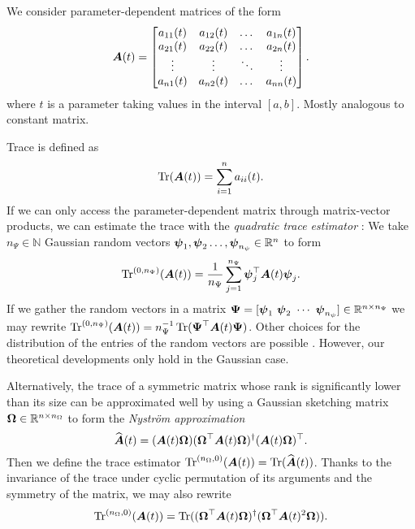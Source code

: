 \documentclass[12pt]{article}
\begin{document}
We consider parameter-dependent matrices of the form
\begin{equation}
    \boldsymbol{A}(t) = \begin{bmatrix}
        a_{11}(t) & a_{12}(t) & \dots & a_{1n}(t) \\
        a_{21}(t) & a_{22}(t) & \dots & a_{2n}(t) \\
        \vdots & \vdots & \ddots & \vdots \\
        a_{n1}(t) & a_{n2}(t) & \dots & a_{nn}(t) \\
    \end{bmatrix}.
\end{equation}
where $t$ is a parameter taking values in the interval $[a,b]$.
Mostly analogous to constant matrix.

Trace is defined as
\begin{equation}
    \operatorname{Tr}(\boldsymbol{A}(t)) = \sum_{i=1}^{n} a_{ii}(t).
\end{equation}
If we can only access the parameter-dependent matrix through matrix-vector products, we can estimate the trace with the \emph{quadratic trace estimator} \cite{}: We take $n_{\Psi} \in \mathbb{N}$ Gaussian random vectors $\boldsymbol{\psi}_1,\boldsymbol{\psi}_2 \dots, \boldsymbol{\psi}_{n_{\psi}} \in \mathbb{R}^{n}$ to form
\begin{equation}
    \operatorname{Tr}^{(0, n_{\Psi})}(\boldsymbol{A}(t)) = \frac{1}{n_{\Psi}} \sum_{j=1}^{n_{\Psi}} \boldsymbol{\psi}_j^{\top} \boldsymbol{A}(t) \boldsymbol{\psi}_j.
\end{equation}
If we gather the random vectors in a matrix $\boldsymbol{\Psi} = [\boldsymbol{\psi}_1 ~ \boldsymbol{\psi}_2 ~ \cdots ~ \boldsymbol{\psi}_{n_{\psi}}] \in \mathbb{R}^{n \times n_{\Psi}}$ we may rewrite $\operatorname{Tr}^{(0, n_{\Psi})}(\boldsymbol{A}(t)) = n_{\Psi}^{-1} \operatorname{Tr}( \boldsymbol{\Psi}^{\top} \boldsymbol{A}(t) \boldsymbol{\Psi})$. Other choices for the distribution of the entries of the random vectors are possible \cite{}. However, our theoretical developments only hold in the Gaussian case.

Alternatively, the trace of a symmetric matrix whose rank is significantly lower than its size can be approximated well by using a Gaussian sketching matrix $\boldsymbol{\Omega} \in \mathbb{R}^{n \times n_{\Omega}}$ to form the \emph{Nystr\"om approximation}
\begin{equation}
    \widehat{\boldsymbol{A}}(t) = (\boldsymbol{A}(t) \boldsymbol{\Omega}) (\boldsymbol{\Omega}^{\top} \boldsymbol{A}(t) \boldsymbol{\Omega})^{\dagger} (\boldsymbol{A}(t) \boldsymbol{\Omega})^{\top}.
\end{equation}
Then we define the trace estimator $\operatorname{Tr}^{(n_{\Omega}, 0)}(\boldsymbol{A}(t)) = \operatorname{Tr}( \widehat{\boldsymbol{A}}(t) )$.
Thanks to the invariance of the trace under cyclic permutation of its arguments and the symmetry of the matrix, we may also rewrite
\begin{equation}
    \operatorname{Tr}^{(n_{\Omega}, 0)}(\boldsymbol{A}(t)) = \operatorname{Tr}( (\boldsymbol{\Omega}^{\top} \boldsymbol{A}(t) \boldsymbol{\Omega})^{\dagger} ( \boldsymbol{\Omega}^{\top} \boldsymbol{A}(t)^2 \boldsymbol{\Omega})).
\end{equation}
\end{document}
